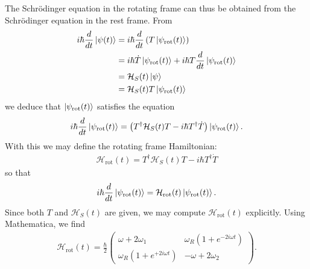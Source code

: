 \documentclass{article}
\theoremstyle{definition}
\newcommand{\ham}{\mathcal{H}}
\newcommand{\f}[2]{\frac{#1}{#2}}
\newcommand{\lp}{\left(}
\newcommand{\rp}{\right)}
\newcommand{\psirot}{\ket{\psi_\text{rot}(t)} }
\begin{document}
\begin{enumerate}[label=\alph*)]
	The Schr\"{o}dinger equation in the rotating frame can thus be obtained from the Schr\"{o}dinger equation in the rest frame. From
	\begin{align*}
	i\hbar \f{d}{dt}\ket{\psi(t)} 
	&= i\hbar \f{d}{dt}\lp T\psirot \rp \\
	&= i\hbar \dot T \psirot + i\hbar T \f{d}{dt}\psirot\\
	&= \ham_S(t)\ket{\psi} \\
	&= \ham_S(t) T\psirot
	\end{align*}
	we deduce that $\psirot$ satisfies the equation
	\begin{align*}
	i\hbar \f{d}{dt}\psirot = \lp T^\dagger \ham_S(t) T -i\hbar T^\dagger \dot T \rp \psirot.
	\end{align*} 
	With this we may define the rotating frame Hamiltonian:
	\begin{align*}
	\ham_\text{rot}(t) = T^\dagger \ham_S(t) T -i\hbar T^\dagger \dot T
	\end{align*}
	so that
	\begin{align*}
	i\hbar \f{d}{dt}\psirot = \ham_\text{rot}(t) \psirot.
	\end{align*}
	Since both $T$ and $\ham_S(t)$ are given, we may compute $\ham_\text{rot}(t)$ explicitly. Using Mathematica, we find
	\begin{align*}
	\ham_\text{rot}(t) = \f{\hbar}{2} \begin{pmatrix}
	 \omega +  2\omega_1 & \omega_R (1+e^{-2i\omega t}) \\ 
	 \omega_R (1+e^{+2i\omega t}) & -\omega + 2\omega_2
	\end{pmatrix}.
	\end{align*}
	

\end{enumerate}
\end{document}

